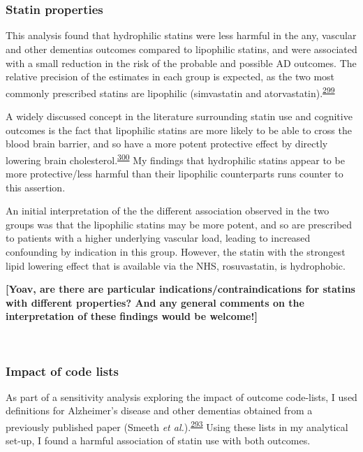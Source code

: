 \documentclass[a4paper, twoside]{templates/ociamthesis}
\begin{document}
~

~

\hypertarget{statin-properties-2}{%
\subsubsection{Statin properties}\label{statin-properties-2}}

This analysis found that hydrophilic statins were less harmful in the any, vascular and other dementias outcomes compared to lipophilic statins, and were associated with a small reduction in the risk of the probable and possible AD outcomes. The relative precision of the estimates in each group is expected, as the two most commonly prescribed statins are lipophilic (simvastatin and atorvastatin).\textsuperscript{\protect\hyperlink{ref-newman2019}{299}}

A widely discussed concept in the literature surrounding statin use and cognitive outcomes is the fact that lipophilic statins are more likely to be able to cross the blood brain barrier, and so have a more potent protective effect by directly lowering brain cholesterol.\textsuperscript{\protect\hyperlink{ref-shepardson2011}{300}} My findings that hydrophilic statins appear to be more protective/less harmful than their lipophilic counterparts runs counter to this assertion.

An initial interpretation of the the different association observed in the two groups was that the lipophilic statins may be more potent, and so are prescribed to patients with a higher underlying vascular load, leading to increased confounding by indication in this group. However, the statin with the strongest lipid lowering effect that is available via the NHS, rosuvastatin, is hydrophobic.

\textbf{{[}Yoav, are there are particular indications/contraindications for statins with different properties? And any general comments on the interpretation of these findings would be welcome!{]}}

~

\hypertarget{impact-of-code-lists}{%
\subsubsection{Impact of code lists}\label{impact-of-code-lists}}

As part of a sensitivity analysis exploring the impact of outcome code-lists, I used definitions for Alzheimer's disease and other dementias obtained from a previously published paper (Smeeth \emph{et al.}).\textsuperscript{\protect\hyperlink{ref-smeeth2009}{293}} Using these lists in my analytical set-up, I found a harmful association of statin use with both outcomes.
\end{document}
